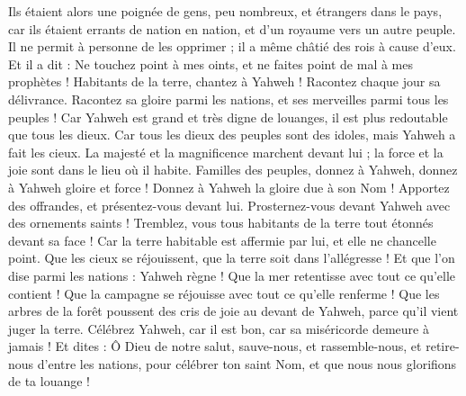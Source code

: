 \begin{multicols}{2}
Ils étaient alors une poignée de gens, peu nombreux, et étrangers dans le pays,
car ils étaient errants de nation en nation, et d'un royaume vers un autre peuple.
Il ne permit à personne de les opprimer ; il a même châtié des rois à cause d'eux.
Et il a dit : Ne touchez point à mes oints, et ne faites point de mal à mes prophètes !
Habitants de la terre, chantez à Yahweh ! Racontez chaque jour sa délivrance.
Racontez sa gloire parmi les nations, et ses merveilles parmi tous les peuples !
Car Yahweh est grand et très digne de louanges, il est plus redoutable que tous les dieux.
Car tous les dieux des peuples sont des idoles, mais Yahweh a fait les cieux.
La majesté et la magnificence marchent devant lui ; la force et la joie sont dans le lieu où il habite.
Familles des peuples, donnez à Yahweh, donnez à Yahweh gloire et force !
Donnez à Yahweh la gloire due à son Nom ! Apportez des offrandes, et présentez-vous devant lui. Prosternez-vous devant Yahweh avec des ornements saints !
Tremblez, vous tous habitants de la terre tout étonnés devant sa face ! Car la terre habitable est affermie par lui, et elle ne chancelle point.
Que les cieux se réjouissent, que la terre soit dans l'allégresse ! Et que l'on dise parmi les nations : Yahweh règne !
Que la mer retentisse avec tout ce qu'elle contient ! Que la campagne se réjouisse avec tout ce qu'elle renferme !
Que les arbres de la forêt poussent des cris de joie au devant de Yahweh, parce qu'il vient juger la terre.
Célébrez Yahweh, car il est bon, car sa miséricorde demeure à jamais !
Et dites : Ô Dieu de notre salut, sauve-nous, et rassemble-nous, et retire-nous d'entre les nations, pour célébrer ton saint Nom, et que nous nous glorifions de ta louange !

\end{multicols}
